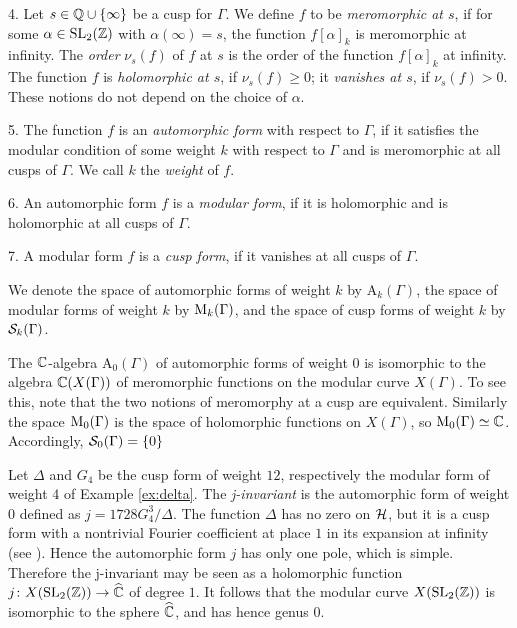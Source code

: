 \begin{defi}
  4. Let $s\in\mathbb{Q}\cup\{\infty\}$ be a cusp for $\Gamma$. We define $f$ to be \emph{meromorphic at $s$}, if for some $\alpha\in\operatorname{SL}_2(\mathbb{Z})$ with $\alpha (\infty)=s$, the function $f[\alpha]_k$ is meromorphic at infinity. The \emph{order} $\nu_s(f)$ of $f$ at $s$ is the order of the function $f[\alpha]_k$ at infinity. The function $f$ is \emph{holomorphic at $s$}, if $\nu_s(f)\geq 0$; it \emph{vanishes at $s$}, if $\nu_s(f)>0$. These notions do not depend on the choice of $\alpha$. 
  
  5. The function $f$ is an \emph{automorphic form} with respect to $\Gamma$, if it satisfies the modular condition of some weight $k$ with respect to $\Gamma$ and is meromorphic at all cusps of $\Gamma$. We call $k$ the \emph{weight} of $f$.
  
  6. An automorphic form $f$ is a \emph{modular form}, if it is holomorphic and is holomorphic at all cusps of $\Gamma$.
  
  7. A modular form $f$ is a \emph{cusp form}, if it vanishes at all cusps of $\Gamma$. 
\end{defi}

We denote the space of automorphic forms of weight $k$ by $\mathrm{A}_k(\Gamma)$, the space of modular forms of weight $k$ by $\mathrm{M}_k(\Gamma)$, and the space of cusp forms of weight $k$ by $\mathcal{S}_k(\Gamma)$.

\begin{rmk}
 The $\mathbb{C}$-algebra $\mathrm{A}_0(\Gamma)$ of automorphic forms of weight $0$ is isomorphic to the algebra $\mathbb{C}(X(\Gamma))$ of meromorphic functions on the modular curve $X(\Gamma)$. To see this, note that the two notions of meromorphy at a cusp are equivalent. Similarly the space $\mathrm{M}_0(\Gamma)$ is the space of holomorphic functions on $X(\Gamma)$, so $\mathrm{M}_0(\Gamma)\simeq\mathbb{C}$. Accordingly, $\mathcal{S}_0(\Gamma)=\{0\}$
\end{rmk}

\begin{expl} \label{ex:j-invariant}
 Let $\Delta$ and $G_4$ be the cusp form of weight $12$, respectively the modular form of weight $4$ of Example \ref{ex:delta}. The \emph{j-invariant} is the automorphic form of weight $0$ defined as $j=1728 G_4^3 / \Delta$. The function $\Delta$ has no zero on $\mathcal{H}$, but it is a cusp form with a nontrivial Fourier coefficient at place $1$ in its expansion at infinity (see \cite[p.\ 73, eq.\ 3.1]{Diamond-Shurman}). Hence the automorphic form $j$ has only one pole, which is simple. Therefore the j-invariant may be seen as a holomorphic function $j\colon X(\operatorname{SL}_2(\mathbb{Z})) \to\widehat{\mathbb{C}}$ of degree $1$. It follows that the modular curve $X(\operatorname{SL}_2(\mathbb{Z}))$ is isomorphic to the sphere $\widehat{\mathbb{C}}$, and has hence genus $0$.
\end{expl}

